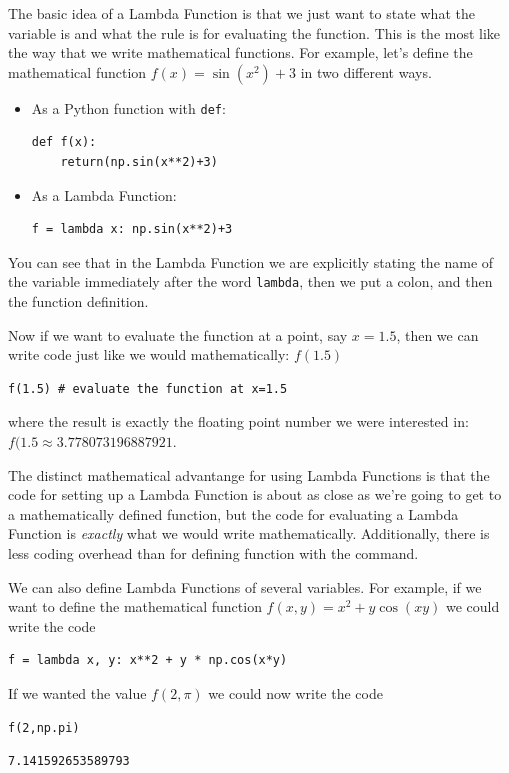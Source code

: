 The basic idea of a Lambda Function is that we just want to state what the variable is and
what the rule is for evaluating the function.  This is the most like the way that we write
mathematical functions.  For example, let's define the mathematical function $f(x) = \sin(x^2)+3$ in two
different ways.  

\begin{itemize}
    \item As a Python function with \texttt{def}:
\begin{lstlisting}
def f(x):
    return(np.sin(x**2)+3)
\end{lstlisting}
    \item As a Lambda Function:
\begin{lstlisting}
f = lambda x: np.sin(x**2)+3
\end{lstlisting}
\end{itemize}

You can see that in the Lambda Function we are explicitly stating the name of the variable
immediately after the word \texttt{lambda}, then we put a colon, and then the function
definition.  

Now if we want to evaluate the function at a point, say $x=1.5$, then we can write code
just like we would mathematically: $f(1.5)$
\begin{lstlisting}
f(1.5) # evaluate the function at x=1.5
\end{lstlisting}
where the result is exactly the floating point number we were interested in:
$f(1.5 \approx 3.778073196887921$.

The distinct mathematical advantange for using Lambda Functions is that the code for
setting up a Lambda Function is about as close as we're going to get to a mathematically
defined function, but the code for evaluating a Lambda Function is {\it exactly} what we
would write mathematically.  Additionally, there is less coding overhead than for defining
function with the  command.

We can also define Lambda Functions of several variables.  For example, if we want to
define the mathematical function $f(x,y) = x^2 + y\cos(xy)$ we could write the code
\begin{lstlisting}
f = lambda x, y: x**2 + y * np.cos(x*y)
\end{lstlisting}
If we wanted the value $f(2,\pi)$ we could now write the code

\bcode
\begin{lstlisting}
f(2,np.pi)
\end{lstlisting}
\boutput
\begin{lstlisting}
7.141592653589793   
\end{lstlisting}


